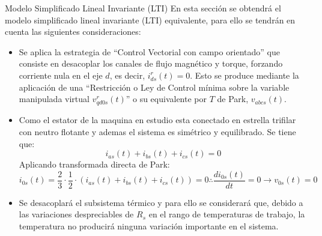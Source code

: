 \documentclass[12pt]{beamer}
\begin{document}
\begin{frame}{Modelo Simplificado Lineal Invariante (LTI)}\footnotesize
En esta sección se obtendrá el modelo simplificado lineal invariante (LTI) equivalente, para ello se tendrán en cuenta las siguientes consideraciones:
\begin{itemize}
    
    \item Se aplica la estrategia de ``Control Vectorial con campo orientado'' que consiste en desacoplar los canales de flujo magnético y torque, forzando corriente nula en el eje \( d \), es decir, \( i^r_{ds}(t) = 0 \). Esto se produce mediante la aplicación de una ``Restricción o Ley de Control mínima sobre la variable manipulada virtual \( v^r_{qd0s}(t) \)'' o su equivalente por \( T \) de Park, \( v_{abcs}(t) \).

    \item Como el estator de la maquina en
    estudio esta conectado en estrella trifilar con neutro flotante y ademas el sistema es simétrico y equilibrado. Se tiene que: 
    \begin{equation}
    i_{as}(t) + i_{bs}(t) + i_{cs}(t) = 0
    \end{equation}
    Aplicando transformada directa de Park:
    \begin{equation}
    \label{eq:neutro_flotante}
    i_{0s}(t) = \frac{2}{3}\cdot\frac{1}{2}\cdot(i_{as}(t) + i_{bs}(t) + i_{cs}(t)) = 0 \therefore \frac{di_{0s}(t)}{dt} = 0 \rightarrow v_{0s}(t) = 0
    \end{equation}

    \item Se desacoplará el subsistema térmico y para ello se considerará que, debido a las variaciones despreciables de \( R_s \) en el rango de temperaturas de trabajo, la temperatura no producirá ninguna variación importante en el sistema.
\end{itemize}
\end{frame}
\end{document}
